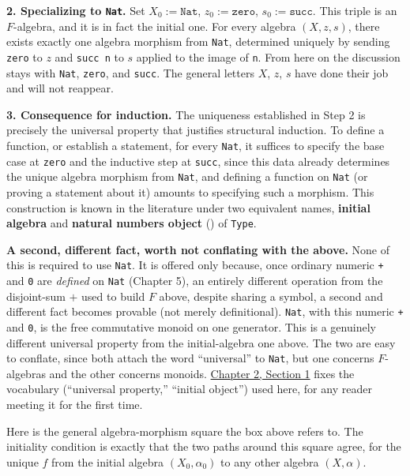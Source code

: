 \begin{mathreading}
\textbf{2. Specializing to \texttt{Nat}.} Set \(X_0 := \mathtt{Nat}\), \(z_0 := \mathtt{zero}\), \(s_0 := \mathtt{succ}\). This triple is an \(F\)-algebra, and it is in fact the initial one. For every algebra \((X, z, s)\), there exists exactly one algebra morphism from \texttt{Nat}, determined uniquely by sending \texttt{zero} to \(z\) and \texttt{succ n} to \(s\) applied to the image of \texttt{n}. From here on the discussion stays with \texttt{Nat}, \texttt{zero}, and \texttt{succ}. The general letters \(X\), \(z\), \(s\) have done their job and will not reappear.

\textbf{3. Consequence for induction.} The uniqueness established in Step 2 is precisely the universal property that justifies structural induction. To define a function, or establish a statement, for every \texttt{Nat}, it suffices to specify the base case at \texttt{zero} and the inductive step at \texttt{succ}, since this data already determines the unique algebra morphism from \texttt{Nat}, and defining a function on \texttt{Nat} (or proving a statement about it) amounts to specifying such a morphism. This construction is known in the literature under two equivalent names, \textbf{initial algebra} and \textbf{natural numbers object} (\cite{Jacobs1999}) of \texttt{Type}.

\textbf{A second, different fact, worth not conflating with the above.} None of this is required to use \texttt{Nat}. It is offered only because, once ordinary numeric \texttt{+} and \texttt{0} are \emph{defined} on \texttt{Nat} (Chapter 5), an entirely different operation from the disjoint-sum \(+\) used to build \(F\) above, despite sharing a symbol, a second and different fact becomes provable (not merely definitional). \texttt{Nat}, with this numeric \texttt{+} and \texttt{0}, is the free commutative monoid on one generator. This is a genuinely different universal property from the initial-algebra one above. The two are easy to conflate, since both attach the word ``universal'' to \texttt{Nat}, but one concerns \(F\)-algebras and the other concerns monoids. \hyperref[sec:02-terminology-and-coc:01-terminology:1]{Chapter 2, Section 1} fixes the vocabulary (``universal property,'' ``initial object'') used here, for any reader meeting it for the first time.

\end{mathreading}

Here is the general algebra-morphism square the box above refers to. The initiality condition is exactly that the two paths around this square agree, for the unique \(f\) from the initial algebra \((X_0, \alpha_0)\) to any other algebra \((X, \alpha)\).

